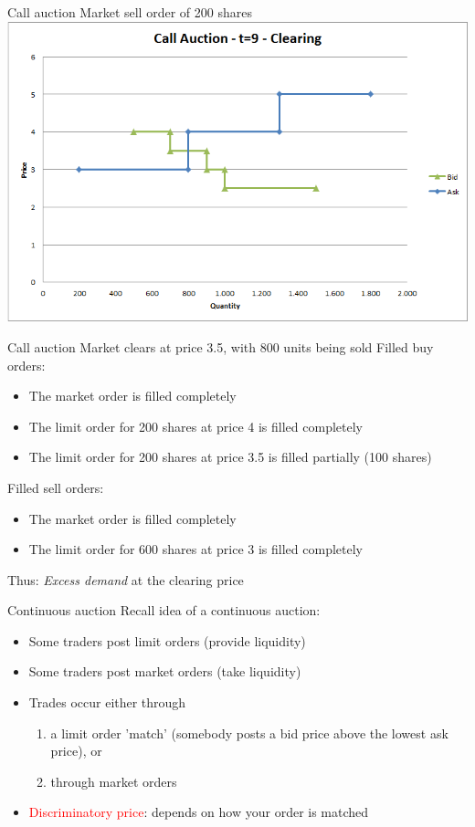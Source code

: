 \documentclass[english,10pt
,aspectratio=169
]{beamer}
\begin{document}
\begin{frame}{Call auction}
	Market sell order of 200 shares
	\quad
	\center
	\includegraphics[width=.75\linewidth]{pics/Call_Clearing}
\end{frame}


\begin{frame}{Call auction}
	Market clears at price 3.5, with 800 units being sold
	Filled buy orders:
	\begin{itemize}
		\item The market order is filled completely
		\item The limit order for 200 shares at price 4 is filled completely
		\item The limit order for 200 shares at price 3.5 is filled partially (100 shares)
	\end{itemize}
	Filled sell orders:
	\begin{itemize}
		\item The market order is filled completely
		\item The limit order for 600 shares at price 3 is filled completely
	\end{itemize}
	Thus: \textit{Excess demand} at the clearing price
\end{frame}


\begin{frame}{Continuous auction}
	Recall idea of a continuous auction:
	\begin{itemize}
		\item Some traders post limit orders (provide liquidity)
		\item Some traders post market orders (take liquidity)
		\item Trades occur either through 
		\begin{enumerate}
			\item a limit order 'match' (somebody posts a bid price above the lowest ask price), or
			\item through market orders
		\end{enumerate}
		\item \textcolor{red}{Discriminatory price}: depends on how your order is matched
	\end{itemize}
\end{frame}
\end{document}
